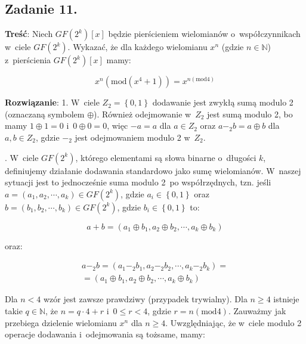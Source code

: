 \documentclass[a4paper,10pt, twocolumn]{article}
\begin{document}
\subsection{Zadanie 11.}

\textbf{Treść}: Niech $GF(2^{k})[x]$ będzie pierścieniem wielomianów o~współczynnikach w~ciele $GF(2^{k})$. Wykazać, że dla każdego wielomianu $x^{n}$ (gdzie $n \in \mathbb{N}$) z~pierścienia $GF(2^{k})[x]$ mamy:

\begin{equation*}
	x^{n}(\text{mod}(x^{4} + 1)) = x^{n(\text{mod} 4)}
\end{equation*}

\textbf{Rozwiązanie}: 1. W~ciele $Z_{2} = \left\{0,1\right\}$ dodawanie jest zwykłą sumą modulo 2 (oznaczaną symbolem $\oplus$). Również odejmowanie w~$Z_{2}$ jest sumą modulo 2, bo mamy $1 \oplus 1 = 0$ i~$0 \oplus 0 = 0$, więc $-a = a$ dla $a \in Z_{2}$ oraz $a -_{2} b = a \oplus b$ dla $a, b \in Z_{2}$, gdzie $-_{2}$ jest odejmowaniem modulo 2 w~$Z_{2}$.

. W~ciele $GF(2^{k})$, którego elementami są słowa binarne o~długości $k$, definiujemy działanie dodawania standardowo jako sumę wielomianów. W~naszej sytuacji jest to jednocześnie suma modulo 2~po współrzędnych, tzn. jeśli $a = (a_{1}, a_{2}, \cdots, a_{k}) \in GF(2^{k})$, gdzie $a_{i} \in \left\{0,1\right\}$ oraz $b = (b_{1}, b_{2}, \cdots, b_{k}) \in GF(2^{k})$, gdzie $b_{i} \in \left\{0,1\right\}$ to:

\begin{equation*}
	a + b = (a_{1} \oplus b_{1}, a_{2} \oplus b_{2}, \cdots, a_{k} \oplus b_{k})
\end{equation*}

\noindent oraz:

\begin{equation*}
	\begin{array}{c} a -_{2} b = (a_{1} -_{2} b_{1}, a_{2} -_{2} b_{2}, \cdots, a_{k} -_{2} b_{k}) = \\ = (a_{1} \oplus b_{1}, a_{2} \oplus b_{2}, \cdots, a_{k} \oplus b_{k}) \end{array}
\end{equation*}

\noindent Dla $n < 4$ wzór jest zawsze prawdziwy (przypadek trywialny). Dla $n \geq 4$ istnieje takie $q \in \mathbb{N}$, że $n = q \cdot 4 + r$ i~$0 \leq r < 4$, gdzie $r = n (\text{mod} 4)$. Zauważmy jak przebiega dzielenie wielomianu $x^{n}$ dla $n \geq 4$. Uwzględniając, że w~ciele modulo 2 operacje dodawania i~odejmowania są tożsame, mamy:
\end{document}
